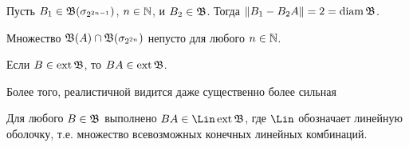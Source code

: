 \begin{hypothesis}
	Пусть $B_1 \in \mathfrak{B}(\sigma_{2^{2n-1}})$, $n\in\mathbb{N}$, и $B_2\in \mathfrak{B}$.
	Тогда $\|B_1 - B_2 A\| = 2 = \operatorname{diam} \mathfrak{B}$.
\end{hypothesis}

\begin{hypothesis}
	Множество $\mathfrak{B}(A) \cap \mathfrak{B} (\sigma_{2^{2n}})$ непусто для любого $n\in \mathbb{N}$.
\end{hypothesis}

\begin{hypothesis}
	Если $B\in\operatorname{ext}\mathfrak{B}$, то $BA \in \operatorname{ext} \mathfrak{B}$.
\end{hypothesis}

Более того, реалистичной видится даже существенно более сильная

\begin{hypothesis}
	Для любого $B\in\mathfrak{B}$ выполнено $BA \in \Lin \ext \B$, где $\Lin$ обозначает линейную оболочку,
	т.е. множество всевозможных конечных линейных комбинаций.
\end{hypothesis}
